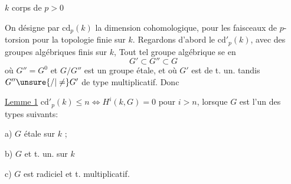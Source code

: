 $k$ corps de  $p>0$

On désigne par $\mathrm{cd}_p(k)$ la dimension cohomologique,
 pour les faisceaux de $p$-torsion pour la
topologie finie   sur $k$. Regardons d'abord
le $\mathrm{cd}'_p(k)$,  avec des groupes algébriques
 finis sur $k$,  Tout tel groupe algébrique se 
en
\[
G'\subset G''\subset G
\]
où $G''=G^0$ et $G/G''$ est un groupe
étale, et où $G'$ est  de t. un. tandis
$G''\unsure{/|\ne}G'$  de type multiplicatif. Donc

\uline{Lemme 1} $\mathrm{cd}'_p(k)\leq n\Longleftrightarrow H^i(k,G)=0$ pour $i>n$,
lorsque $G$ est  l'un des types suivants:

a) $G$ étale sur $k$ ; 

b) $G$  et t. un. sur $k$

c) $G$ est radiciel et t. multiplicatif.


